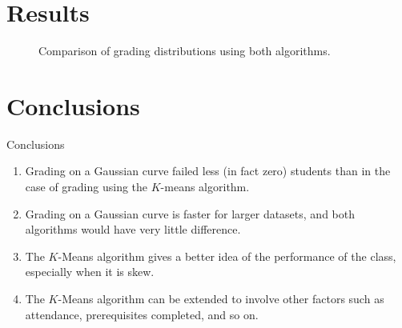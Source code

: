 \documentclass{beamer}
\theoremstyle{remark}
\begin{document}
\section{Results}
\begin{frame}
    \pause
    \begin{figure}
        \centering
        \qquad
        \caption{Comparison of grading distributions using both algorithms.}
    \end{figure}
\end{frame}

\section{Conclusions}
\begin{frame}{Conclusions}
    \pause
    \begin{enumerate}
        \item Grading on a Gaussian curve failed less (in fact zero) students 
        than in the case of grading using the $K$-means algorithm.
        \pause
        \item Grading on a Gaussian curve is faster for larger datasets, and
        both algorithms would have very little difference.
        \pause
        \item The $K$-Means algorithm gives a better idea of the performance
        of the class, especially when it is skew.
        \pause
        \item The $K$-Means algorithm can be extended to involve other factors
        such as attendance, prerequisites completed, and so on.
    \end{enumerate}
\end{frame}
\end{document}
